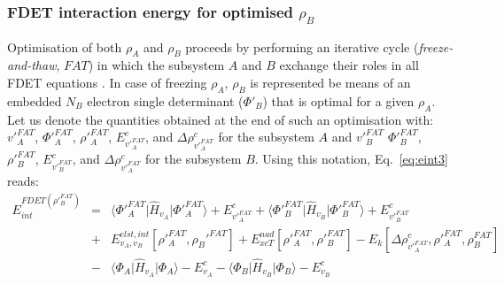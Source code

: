 \documentclass[amsmath,amssymb,preprint,aip,jcp]{revtex4-1}
\begin{document}
 \subsubsection{FDET interaction energy for  optimised $\rho_B$}
Optimisation of both $\rho_A$ and $\rho_B$  proceeds by performing an iterative cycle (\textit{freeze-and-thaw}, $FAT$) in which the
subsystem $A$ and $B$ exchange their roles  in all FDET equations \cite{Wesolowski1996a}. 
In case of freezing $\rho_A$,  $\rho_B$ is represented be means of an embedded $N_B$ electron single determinant ($\Phi'_B$) that is optimal  for a given $\rho_A$. Let us denote the quantities obtained at the end of such an optimisation with: $v'^{FAT}_A$, $\Phi'^{FAT}_A$, $\rho'^{FAT}_A$, 
 $E^{c}_{v'^{FAT}_A}$, and $\Delta \rho^{c}_{v'^{FAT}_A}$  for the subsystem $A$ and
 $v'^{FAT}_B$ $\Phi'^{FAT}_B$, $\rho'^{FAT}_B$, 
 $E^{c}_{v'^{FAT}_B}$, and $\Delta \rho^{c}_{v'^{FAT}_A}$  for the subsystem $B$. Using this notation, Eq.~\ref{eq:eint3} reads: 
 \begin{eqnarray}
E_{int}^{FDET(\rho'^{FAT}_B)} 
&=&  \langle\Phi'^{FAT}_{A}\vert \hat{H}_{v_A}\vert \Phi'^{FAT}_{A}\rangle + E^{c}_{v'^{FAT}_A} + \langle\Phi'^{FAT}_{B}\vert \hat{H}_{v_B}\vert \Phi'^{FAT}_{B}\rangle  + E^{c}_{v'^{FAT}_B} \label{eq:eint4A}\\ \nonumber
&+& E^{elst,int}_{v_A,v_B}[\rho'^{FAT}_A,\rho_B'^{FAT}] + {E}_{xcT}^{nad}[\rho'^{FAT}_A,\rho'^{FAT}_B]-     E_k[\Delta \rho^{c}_{v'^{FAT}_A}, \rho'^{FAT}_A, \rho^{FAT}_B]  \nonumber\\
&-& 
\langle\Phi_{A}\vert \hat{H}_{v_A}\vert \Phi_{A}\rangle - E^{c}_{v_A}
- \langle\Phi_{B}\vert \hat{H}_{v_B}\vert \Phi_{B}\rangle - E^{c}_{v_B}\nonumber
\end{eqnarray}
\end{document}
